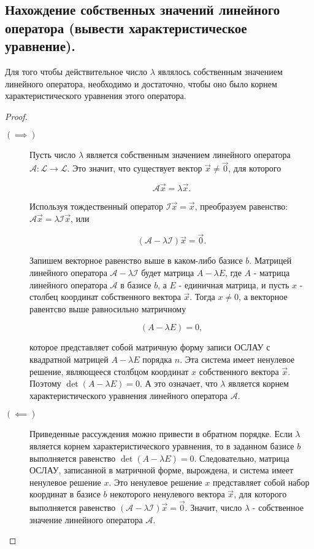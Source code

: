 \subsection{
    Нахождение собственных значений линейного оператора (вывести характеристическое уравнение).
}

\begin{theorem}
    Для того чтобы действительное число $\lambda$ являлось собственным значением линейного оператора, необходимо и достаточно, чтобы оно было корнем характеристического уравнения этого оператора.
\end{theorem}

\begin{proof}~
    \begin{description}
        \item[$(\implies)$] 
            Пусть число $\lambda$ является собственным значением линейного оператора $\mathscr{A} \colon \mathcal{L} \to \mathcal{L}$. Это значит, что существует вектор $\vec{x} \ne \vec{0}$, для которого 

            $$\mathscr{A}\vec{x} = \lambda \vec{x}.$$

            Используя тождественный оператор $\mathscr{I}\vec{x} = \vec{x}$, преобразуем равенство: $\mathscr{A}\vec{x} = \lambda\mathscr{I}\vec{x}$, или
            
            $$(\mathscr{A} - \lambda\mathscr{I})\vec{x} = \vec{0}.$$

            Запишем векторное равенство выше в каком-либо базисе $b$. Матрицей линейного оператора $\mathscr{A} - \lambda\mathscr{I}$ будет матрица $A - \lambda E$, где $A$ - матрица линейного оператора $\mathscr{A}$ в базисе $b$, а $E$ - единичная матрица, и пусть $x$ - столбец координат собственного вектора $\vec{x}$. Тогда $x \ne 0$, а векторное равентсво выше равносильно матричному

            $$(A - \lambda E) = 0,$$

            которое представляет собой матричную форму записи ОСЛАУ с квадратной матрицей $A - \lambda E$ порядка $n$. Эта система имеет ненулевое решение, являющееся столбцом координат $x$ собственного вектора $\vec{x}$. Поэтому $\det(A - \lambda E) = 0$. А это означает, что $\lambda$ является корнем характеристического уравнения линейного оператора $\mathscr{A}$.
        \item[$(\impliedby)$]
            Приведенные рассуждения можно привести в обратном порядке. Если $\lambda$ является корнем характеристического уравнения, то в заданном базисе $b$ выполняется равенство $\det (A - \lambda E) = 0$. Следовательно, матрица ОСЛАУ, записанной в матричной форме, вырождена, и система имеет ненулевое решение $x$. Это ненулевое решение $x$ представляет собой набор координат в базисе $b$ некоторого ненулевого вектора $\vec{x}$, для которого выполняется равенство $(\mathscr{A} - \lambda\mathscr{I})\vec{x} = \vec{0}$. Значит, число $\lambda$ - собственное значение линейного оператора $\mathscr{A}$.
    \end{description}
\end{proof}
